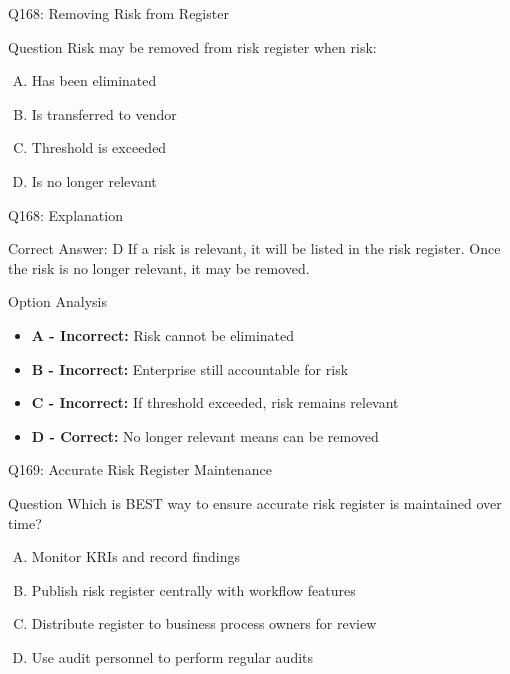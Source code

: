 \documentclass{beamer}
\begin{document}
	\begin{frame}{Q168: Removing Risk from Register}
		\begin{block}{Question}
			Risk may be removed from risk register when risk:
		\end{block}
		\begin{enumerate}[(A)]
			\item Has been eliminated
			\item Is transferred to vendor
			\item Threshold is exceeded
			\item Is no longer relevant
		\end{enumerate}
	\end{frame}
	
	\begin{frame}{Q168: Explanation}
		\begin{block}{Correct Answer: D}
			If a risk is relevant, it will be listed in the risk register. Once the risk is no longer relevant, it may be removed.
		\end{block}
		\begin{block}{Option Analysis}
			\begin{itemize}
				\item \textbf{A - Incorrect:} Risk cannot be eliminated
				\item \textbf{B - Incorrect:} Enterprise still accountable for risk
				\item \textbf{C - Incorrect:} If threshold exceeded, risk remains relevant
				\item \textbf{D - Correct:} No longer relevant means can be removed
			\end{itemize}
		\end{block}
	\end{frame}
	
	\begin{frame}{Q169: Accurate Risk Register Maintenance}
		\begin{block}{Question}
			Which is BEST way to ensure accurate risk register is maintained over time?
		\end{block}
		\begin{enumerate}[(A)]
			\item Monitor KRIs and record findings
			\item Publish risk register centrally with workflow features
			\item Distribute register to business process owners for review
			\item Use audit personnel to perform regular audits
		\end{enumerate}
	\end{frame}
	
\end{document}
